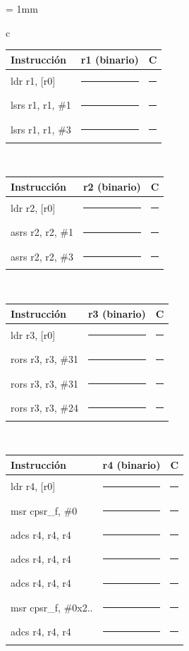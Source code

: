 \begin{center}
\small
\colorbox[gray]{0.9}{
\tabcolsep = 1mm
\begin{tabular}{c}
\colorbox[gray]{1}{
\begin{tabular}{|p{3cm}||c|c|}
\hline
Instrucción & r1 (binario) & C \\
\hline\hline
ldr r1, [r0]&\rule{6cm}{0cm}&\rule{1cm}{0cm}\\
\hline
lsrs r1, r1, \#1&\rule{6cm}{0cm}&\rule{1cm}{0cm}\\
\hline
lsrs r1, r1, \#3&\rule{6cm}{0cm}&\rule{1cm}{0cm}\\
\hline
\end{tabular}
}
\\[1mm]
\colorbox[gray]{1}{
\begin{tabular}{|p{3cm}||c|c|}
\hline
Instrucción & r2 (binario) & C \\
\hline\hline
ldr r2, [r0]&\rule{6cm}{0cm}&\rule{1cm}{0cm}\\
\hline
asrs r2, r2, \#1&\rule{6cm}{0cm}&\rule{1cm}{0cm}\\
\hline
asrs r2, r2, \#3&\rule{6cm}{0cm}&\rule{1cm}{0cm}\\
\hline
\end{tabular}
}
\\[1mm]
\colorbox[gray]{1}{
\begin{tabular}{|p{3cm}||c|c|}
\hline
Instrucción & r3 (binario) & C \\
\hline\hline
ldr r3, [r0]&\rule{6cm}{0cm}&\rule{1cm}{0cm}\\
\hline
rors r3, r3, \#31&\rule{6cm}{0cm}&\rule{1cm}{0cm}\\
\hline
rors r3, r3, \#31&\rule{6cm}{0cm}&\rule{1cm}{0cm}\\
\hline
rors r3, r3, \#24&\rule{6cm}{0cm}&\rule{1cm}{0cm}\\
\hline
\end{tabular}
}
\\[1mm]
\colorbox[gray]{1}{
\begin{tabular}{|p{3.2cm}||c|c|}
\hline
Instrucción & r4 (binario) & C \\
\hline\hline
ldr r4, [r0]&\rule{6cm}{0cm}&\rule{1cm}{0cm}\\
\hline
msr cpsr\_f, \#0&\rule{6cm}{0cm}&\rule{1cm}{0cm}\\
\hline
adcs r4, r4, r4&\rule{6cm}{0cm}&\rule{1cm}{0cm}\\
\hline
adcs r4, r4, r4&\rule{6cm}{0cm}&\rule{1cm}{0cm}\\
\hline
adcs r4, r4, r4&\rule{6cm}{0cm}&\rule{1cm}{0cm}\\
\hline
msr cpsr\_f, \#0x2..&\rule{6cm}{0cm}&\rule{1cm}{0cm}\\
\hline
adcs r4, r4, r4&\rule{6cm}{0cm}&\rule{1cm}{0cm}\\
\hline 
\end{tabular}
}
\\[1mm]
\end{tabular}
}
\end{center}

